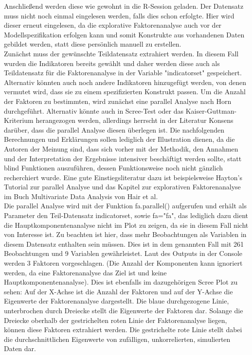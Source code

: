 \documentclass{article}\usepackage[]{graphicx}\usepackage[]{color}
\begin{document}
Anschließend werden diese wie gewohnt in die R-Session geladen. Der Datensatz muss nicht noch einmal eingelesen werden, falls dies schon erfolgte. Hier wird dieser erneut eingelesen, da die explorative Faktorenanalyse auch vor der Modellspezifikation erfolgen kann und somit Konstrukte aus vorhandenen Daten gebildet werden, statt diese persönlich manuell zu erstellen.\\
Zunächst muss der gewünschte Teildatensatz extrahiert werden. In diesem Fall wurden die Indikatoren bereits gewählt und daher werden diese auch als Teildatensatz für die Faktorenanalyse in der Variable "indicatorset" gespeichert. Alternativ könnten auch noch andere Indikatoren hinzugefügt werden, von denen vermutet wird, dass sie zu einem spezifizierten Konstrukt passen. Um die Anzahl der Faktoren zu bestimmten, wird zunächst eine parallel Analyse nach Horn\cite{horn1965rationale} durchgeführt. Alternativ könnte auch in Scree-Test oder das Kaiser-Guttman-Kriterium herangezogen werden, allerdings herrscht in der Literatur Konsens darüber, dass die parallel Analyse diesen überlegen ist.\cite{dinno2009exploring} Die nachfolgenden Berechnungen und Erklärungen sollen lediglich der Illustration dienen, da die Autoren der Meinung sind, dass sich vorher mit der Methodik, den Annahmen und der Interpretation der Ergebnisse intensiver beschäftigt werden sollte, statt blind Funktionen auszuführen, dessen Funktionsweise noch nicht gänzlich recherchiert wurde. Eine gute Einstiegsliteratur dazu ist beispielsweise Hayton's Tutorial zur parallel Analyse\cite{hayton2004factor} und das Kapitel zur explorativen Faktorenanalyse im Buch Multivariate Data Analysis von Hair et al.\cite{hair2006multivariate}\\
Die parallel Analyse wird mit der Funktion fa.parallel() aufgerufen und erhält als Parameter den Teil-Datensatz indicatorset, sowie fa="fa", das lediglich dazu dient die Hauptkomponentenanalyse nicht im Plot zu zeigen, da sie in diesem Fall nicht von Interesse ist. Zu beachten ist hier, dass mehr Beobachtungen als Variablen in diesem Datensatz enthalten sein müssen. Dies ist in dem genannten Fall mit 261 Beobachtungen und 9 Variablen gewährleistet. Laut des Outputs in der Console werden 3 Faktoren vorgeschlagen. (Die Anzahl der Komponenten kann ignoriert werden, da eine Faktorenanalyse das Ziel ist und keine Hauptkomponentenanalyse). Dies ist ebenfalls im dazugehörigen Scree Plot zu sehen: Auf der X-Achse ist die Anzahl der Faktoren und auf der Y-Achse die Eigenwerte der Faktorenanalyse dargestellt. Die blaue durchgezogene Linie, unterbrochen durch Dreiecke stellt die Eigenwerte der Faktoren dar. Solange die Dreiecke oberhalb der gestrichelten roten Linie der Faktorenanalyse liegen, können diese Faktoren extrahiert werden. Die gestrichelte rote Linie stellt dabei die durchschnittlichen Eigenwerte von zufälligen, unkorrelierten, simulierten Daten dar.\\
\end{document}
